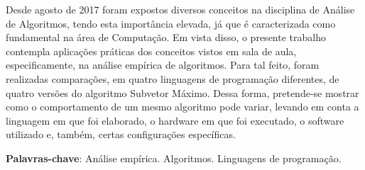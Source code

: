 \documentclass[
	12pt,				%
	oneside,   	        %
	a4paper,			%
	english,			%
	french,				%
	spanish,			%
	brazil,				%
	]{pacotes/abntex2}
\begin{document}
\frenchspacing 



\imprimirfolhaderosto



\begin{resumo}
 Desde agosto de 2017 foram expostos diversos conceitos na disciplina de Análise de Algoritmos, tendo esta importância elevada, já que é caracterizada como fundamental na área de Computação. Em vista disso, o presente trabalho contempla aplicações práticas dos conceitos vistos em sala de aula, especificamente, na análise empírica de algoritmos. Para tal feito, foram realizadas comparações, em quatro linguagens de programação diferentes, de quatro versões do algoritmo Subvetor Máximo. Dessa forma, pretende-se mostrar como o comportamento de um mesmo algoritmo pode variar, levando em conta a linguagem em que foi elaborado, o hardware em que foi executado, o software utilizado e, também, certas configurações específicas. 

 \vspace{\onelineskip}
    
 \noindent
 \textbf{Palavras-chave}: Análise empírica. Algoritmos. Linguagens de programação.
\end{resumo}




\tableofcontents*
\cleardoublepage
\end{document}
